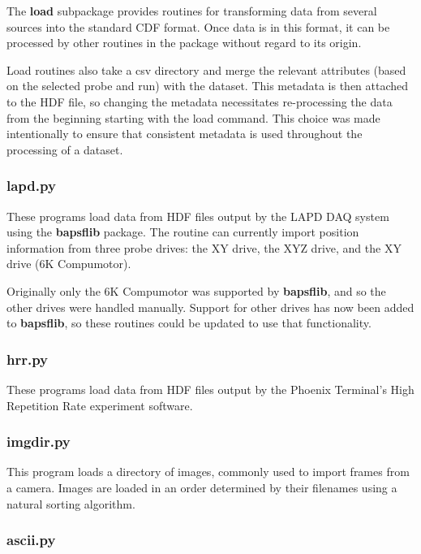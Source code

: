 \documentclass[12pt]{article}
\newcommand{\loc}[1]{{\bf \fontfamily{pcr}\selectfont #1}}
\newcommand{\todo}[1]{ \begin{tcolorbox} \centering  #1 \end{tcolorbox}}
\begin{document}
The \loc{load} subpackage provides routines for transforming data from several sources into the standard CDF format. Once data is in this format, it can be processed by other routines in the package without regard to its origin.

Load routines also take a csv directory and merge the relevant attributes (based on the selected probe and run) with the dataset. This metadata is then attached to the HDF file, so changing the metadata necessitates re-processing the data from the beginning starting with the load command. This choice was made intentionally to ensure that consistent metadata is used throughout the processing of a dataset.

\subsubsection{\loc{lapd.py}}

These programs load data from HDF files output by the LAPD DAQ system using the \loc{bapsflib} package. The routine can currently import position information from three probe drives: the XY drive, the XYZ drive, and the XY drive (6K Compumotor). 

\todo{Originally only the 6K Compumotor was supported by \loc{bapsflib}, and so the other drives were handled manually. Support for other drives has now been added to \loc{bapsflib}, so these routines could be updated to use that functionality.}

\subsubsection{\loc{hrr.py}}

These programs load data from HDF files output by the Phoenix Terminal's High Repetition Rate experiment software. 

\subsubsection{\loc{imgdir.py}}

This program loads a directory of images, commonly used to import frames from a camera. Images are loaded in an order determined by their filenames using a natural sorting algorithm.


\subsubsection{\loc{ascii.py}}
\end{document}
